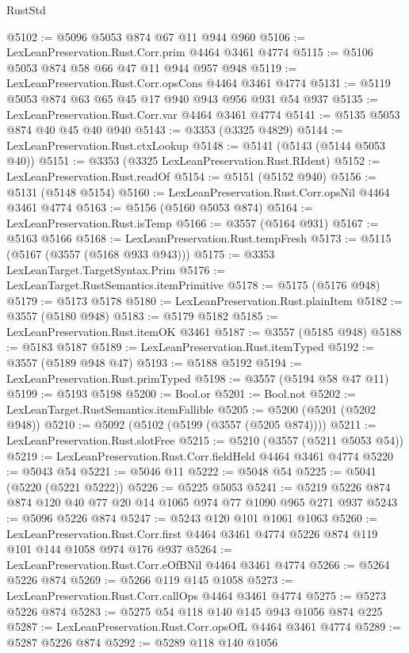 \begin{lexlean}{RustStd}
\begin{coremodule}
@5102 := @5096 @5053 @874 @67 @11 @944 @960
@5106 := LexLeanPreservation.Rust.Corr.prim @4464 @3461 @4774
@5115 := @5106 @5053 @874 @58 @66 @47 @11 @944 @957 @948
@5119 := LexLeanPreservation.Rust.Corr.opsCons @4464 @3461 @4774
@5131 := @5119 @5053 @874 @63 @65 @45 @17 @940 @943 @956 @931 @54 @937
@5135 := LexLeanPreservation.Rust.Corr.var @4464 @3461 @4774
@5141 := @5135 @5053 @874 @40 @45 @40 @940
@5143 := @3353 (@3325 @4829)
@5144 := LexLeanPreservation.Rust.ctxLookup
@5148 := @5141 (@5143 (@5144 @5053 @40))
@5151 := @3353 (@3325 LexLeanPreservation.Rust.RIdent)
@5152 := LexLeanPreservation.Rust.readOf
@5154 := @5151 (@5152 @940)
@5156 := @5131 (@5148 @5154)
@5160 := LexLeanPreservation.Rust.Corr.opsNil @4464 @3461 @4774
@5163 := @5156 (@5160 @5053 @874)
@5164 := LexLeanPreservation.Rust.isTemp
@5166 := @3557 (@5164 @931)
@5167 := @5163 @5166
@5168 := LexLeanPreservation.Rust.tempFresh
@5173 := @5115 (@5167 (@3557 (@5168 @933 @943)))
@5175 := @3353 LexLeanTarget.TargetSyntax.Prim
@5176 := LexLeanTarget.RustSemantics.itemPrimitive
@5178 := @5175 (@5176 @948)
@5179 := @5173 @5178
@5180 := LexLeanPreservation.Rust.plainItem
@5182 := @3557 (@5180 @948)
@5183 := @5179 @5182
@5185 := LexLeanPreservation.Rust.itemOK @3461
@5187 := @3557 (@5185 @948)
@5188 := @5183 @5187
@5189 := LexLeanPreservation.Rust.itemTyped
@5192 := @3557 (@5189 @948 @47)
@5193 := @5188 @5192
@5194 := LexLeanPreservation.Rust.primTyped
@5198 := @3557 (@5194 @58 @47 @11)
@5199 := @5193 @5198
@5200 := Bool.or
@5201 := Bool.not
@5202 := LexLeanTarget.RustSemantics.itemFallible
@5205 := @5200 (@5201 (@5202 @948))
@5210 := @5092 (@5102 (@5199 (@3557 (@5205 @874))))
@5211 := LexLeanPreservation.Rust.slotFree
@5215 := @5210 (@3557 (@5211 @5053 @54))
@5219 := LexLeanPreservation.Rust.Corr.fieldHeld @4464 @3461 @4774
@5220 := @5043 @54
@5221 := @5046 @11
@5222 := @5048 @54
@5225 := @5041 (@5220 (@5221 @5222))
@5226 := @5225 @5053
@5241 := @5219 @5226 @874 @874 @120 @40 @77 @20 @14 @1065 @974 @77 @1090 @965 @271 @937
@5243 := @5096 @5226 @874
@5247 := @5243 @120 @101 @1061 @1063
@5260 := LexLeanPreservation.Rust.Corr.first
    @4464
    @3461
    @4774
    @5226
    @874
    @119
    @101
    @144
    @1058
    @974
    @176
    @937
@5264 := LexLeanPreservation.Rust.Corr.eOfBNil @4464 @3461 @4774
@5266 := @5264 @5226 @874
@5269 := @5266 @119 @145 @1058
@5273 := LexLeanPreservation.Rust.Corr.callOps @4464 @3461 @4774
@5275 := @5273 @5226 @874
@5283 := @5275 @54 @118 @140 @145 @943 @1056 @874 @225
@5287 := LexLeanPreservation.Rust.Corr.opsOfL @4464 @3461 @4774
@5289 := @5287 @5226 @874
@5292 := @5289 @118 @140 @1056

\end{coremodule}
\end{lexlean}
